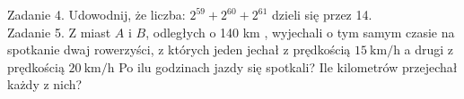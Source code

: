 \documentclass[10pt]{article}
\begin{document}
Zadanie 4. Udowodnij, że liczba: \(2^{59}+2^{60}+2^{61}\) dzieli się przez 14.\\
Zadanie 5. Z miast \(A\) i \(B\), odległych o 140 km , wyjechali o tym samym czasie na spotkanie dwaj rowerzyści, z których jeden jechał z prędkością \(15 \mathrm{~km} / \mathrm{h}\) a drugi z prędkością \(20 \mathrm{~km} / \mathrm{h}\) Po ilu godzinach jazdy się spotkali? Ile kilometrów przejechał każdy z nich?
\end{document}
